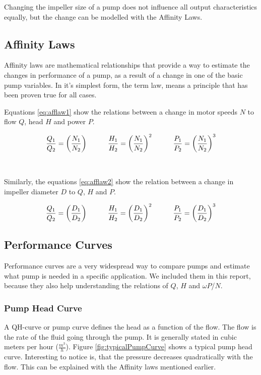 Changing the impeller size of a pump does not influence all output characteristics equally,
but the change can be modelled with the Affinity Laws.

\subsection{Affinity Laws}\label{sub:afflaws}
Affinity laws are mathematical relationships that provide a way to estimate the 
changes in performance of a pump, as a result of a change in one of the basic pump variables.
In it's simplest form, the term law, means a principle that has been proven true for all cases.

Equations \ref{eq:afflaw1} show the relations between a change in motor speeds $N$
to flow $Q$, head $H$ and power $P$.

\begin{equation}
	\frac{Q_1}{Q_2} = \left(\frac{N_1}{N_2}\right)
	\hspace{10mm}
	\frac{H_1}{H_2} = \left(\frac{N_1}{N_2}\right)^2
	\hspace{10mm}
	\frac{P_1}{P_2} = \left(\frac{N_1}{N_2}\right)^3
	\label{eq:afflaw1}	
\end{equation}
\cite{Volk2014}\\\\
Similarly, the equations \ref{eq:afflaw2} show the relation between a change in impeller diameter $D$
to  $Q$, $H$ and $P$.

\begin{equation}
	\frac{Q_1}{Q_2} = \left(\frac{D_1}{D_2}\right)
	\hspace{10mm}
	\frac{H_1}{H_2} = \left(\frac{D_1}{D_2}\right)^2
	\hspace{10mm}
	\frac{P_1}{P_2} = \left(\frac{D_1}{D_2}\right)^3
	\label{eq:afflaw2}	
\end{equation}
\cite{Volk2014}

\subsection{Performance Curves}
Performance curves are a very widespread way to compare pumps
and estimate what pump is needed in a specific application.
We included them in this report,
because they also help understanding the relations of $Q$, $H$ and $\omega P$/$N$.

\subsubsection{Pump Head Curve}
A QH-curve or pump curve defines the head as a function of the flow. 
The flow is the rate of the fluid going through the pump.
It is generally stated in cubic meters per hour ($\frac{m^{3}}{h}$).
Figure \ref{fig:typicalPumpCurve} shows a typical pump head curve.
Interesting to notice is,
that the pressure decreases quadratically with the flow.
This can be explained with the Affinity laws mentioned earlier.

